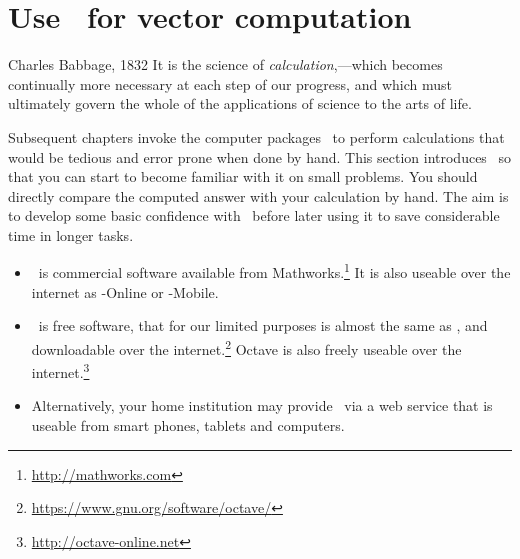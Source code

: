 

\section{Use \script\ for vector computation}
\label{sec:umovc}
\secttoc


\begin{quoted}{Charles Babbage, 1832}
It is the science of \emph{calculation},---which becomes continually more necessary at each step of our progress, and which must ultimately govern the whole of the applications of science to the arts of life.
\end{quoted}

Subsequent chapters invoke the computer packages \script\ to perform calculations that would be tedious and error prone when done by hand.
This section introduces \script\ so that you can start to become familiar with it on small problems.
You should directly compare the computed answer with your calculation by hand.
The aim is to develop some basic confidence with \script\ before later using it to save considerable time in longer tasks.

\begin{itemize}
\item  \script[1]\ is commercial software available from Mathworks.\footnote{\url{http://mathworks.com}}
It is also useable over the internet as \script[1]-Online or \script[1]-Mobile.
\item \script[2]\ is free software, that for our limited purposes is almost the same as \script[1], and downloadable over the internet.\footnote{\url{https://www.gnu.org/software/octave/}}
Octave is also freely useable over the internet.\footnote{\url{http://octave-online.net}} 
\item Alternatively, your home institution may provide \script\ via a web service that is useable from smart phones, tablets and computers.
\end{itemize}



\begin{comment}
Avoid plotting because I do not want to confuse a vector with a row vector of plot points.  Plotting is also not high priority.
\end{comment}




